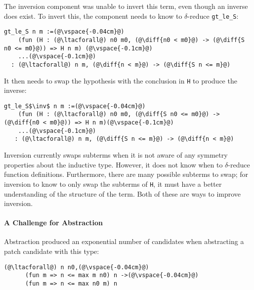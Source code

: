 The inversion component was unable to invert this term, even though an inverse does exist.
To invert this, the component needs to know to $\delta$-reduce \lstinline{gt_le_S}:

\begin{lstlisting}[language=coq]
  gt_le_S n m :=(@\vspace{-0.04cm}@)
    (fun (H : (@\ltacforall@) n0 m0, (@\diff{n0 < m0}@) -> (@\diff{S n0 <= m0}@)) => H n m) (@\vspace{-0.1cm}@)
    ...(@\vspace{-0.1cm}@)
  : (@\ltacforall@) n m, (@\diff{n < m}@) -> (@\diff{S n <= m}@)
\end{lstlisting}

It then needs to swap the hypothesis with the conclusion in \lstinline{H} to produce the inverse:

\begin{lstlisting}[language=coq]
  gt_le_S$\inv$ n m :=(@\vspace{-0.04cm}@)
    (fun (H : (@\ltacforall@) n0 m0, (@\diff{S n0 <= m0}@) -> (@\diff{n0 < m0}@)) => H n m)(@\vspace{-0.1cm}@)
    ...(@\vspace{-0.1cm}@)
   : (@\ltacforall@) n m, (@\diff{S n <= m}@) -> (@\diff{n < m}@)
\end{lstlisting}

Inversion currently swaps subterms when it is not
aware of any symmetry properties about the inductive type. However,
it does not know when to $\delta$-reduce function definitions. Furthermore, 
there are many possible subterms to swap;
for inversion to know to only swap the subterms of \lstinline{H}, it must have a better
understanding of the structure of the term. Both of these are ways to improve inversion.

\paragraph{A Challenge for Abstraction} Abstraction produced an exponential number of candidates when abstracting a patch candidate with this type:

\begin{lstlisting}[language=coq]
    (@\ltacforall@) n n0,(@\vspace{-0.04cm}@)
      (fun m => n <= max m n0) n ->(@\vspace{-0.04cm}@)
      (fun m => n <= max n0 m) n
\end{lstlisting}


